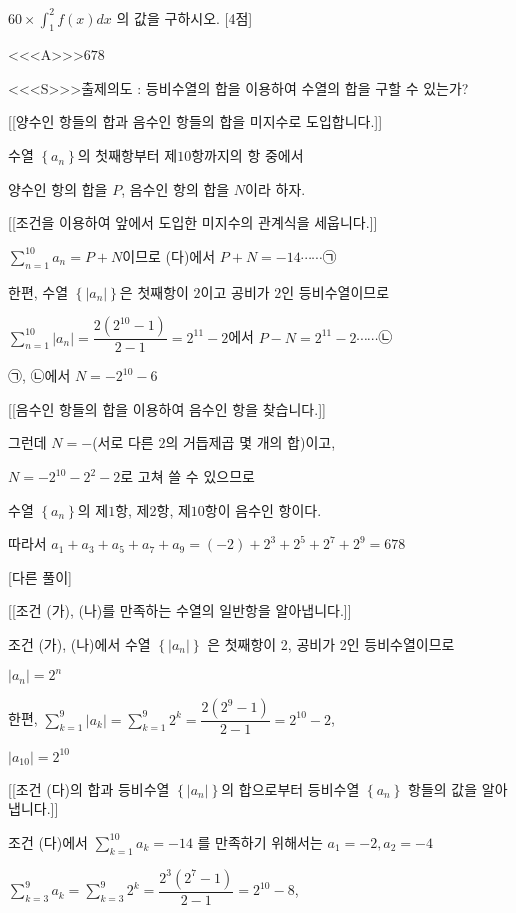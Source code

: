 \documentclass{oblivoir}
\begin{document}
$60 \times \displaystyle\int_{1}^{2} f(x) d x$ 의 값을 구하시오. [4점]


<<<A>>>$678$

<<<S>>>출제의도 : 등비수열의 합을 이용하여 수열의 합을 구할 수 있는가?

[[양수인 항들의 합과 음수인 항들의 합을 미지수로 도입합니다.]]

수열 $\left\{a_{n}\right\}$의 첫째항부터 제$10$항까지의 항 중에서

양수인 항의 합을 $P$, 음수인 항의 합을 $N$이라 하자.

[[조건을 이용하여 앞에서 도입한 미지수의 관계식을 세웁니다.]]

$\sum_{n=1}^{10}a_{n}=P+N$이므로 (다)에서 $P+N=-14\cdots\cdots$㉠

한편, 수열 $\left\{\left | a_{n}\right |\right\}$은 첫째항이 $2$이고 공비가 $2$인 등비수열이므로

$\sum_{n=1}^{10}\left | a_{n}\right | =\dfrac{2(2^{10}-1)}{2-1}=2^{11}-2$에서 $P-N=2^{11}-2\cdots\cdots$㉡

㉠, ㉡에서 $N=-2^{10}-6$

[[음수인 항들의 합을 이용하여 음수인 항을 찾습니다.]]

그런데 $N=-$(서로 다른 $2$의 거듭제곱 몇 개의 합)이고, 

$N=-2^{10}-2^{2}-2$로 고쳐 쓸 수 있으므로

수열 $\left\{a_{n}\right\}$의 제$1$항, 제$2$항, 제$10$항이 음수인 항이다.

따라서 $a_{1}+a_{3}+a_{5}+a_{7}+a_{9}=(-2)+2^{3}+2^{5}+2^{7}+2^{9}=678$

[다른 풀이]

[[조건 (가), (나)를 만족하는 수열의 일반항을 알아냅니다.]]

조건 (가), (나)에서 수열 $\left\{\left|a_{n}\right|\right\}$ 은 첫째항이 2, 공비가 2인 등비수열이므로

$\left|a_{n}\right|=2^{n}$

한편,
$\displaystyle\sum_{k=1}^{9}\left|a_{k}\right|=\displaystyle\sum_{k=1}^{9} 2^{k}=\dfrac{2\left(2^{9}-1\right)}{2-1}=2^{10}-2$,

$\left|a_{10}\right|=2^{10}$

[[조건 (다)의 합과 등비수열 $\left\{\left|a_{n}\right|\right\}$의 합으로부터 등비수열  $\left\{a_{n}\right\}$ 항들의 값을 알아냅니다.]]

조건 (다)에서 $\displaystyle\sum_{k=1}^{10} a_{k}=-14$ 를 만족하기 위해서는
$a_{1}=-2, a_{2}=-4$

$\displaystyle\sum_{k=3}^{9} a_{k}=\displaystyle\sum_{k=3}^{9} 2^{k}=\dfrac{2^{3}\left(2^{7}-1\right)}{2-1}=2^{10}-8$,
\end{document}

